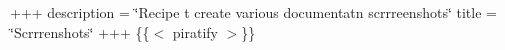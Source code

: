 +++ description = \char`\"{}\+Recipe t\textquotesingle{} create various documentat\textquotesingle{}n scrrreenshots\char`\"{} title = \char`\"{}\+Scrrrenshots\char`\"{} +++ \{\{$<$ piratify $>$\}\} 